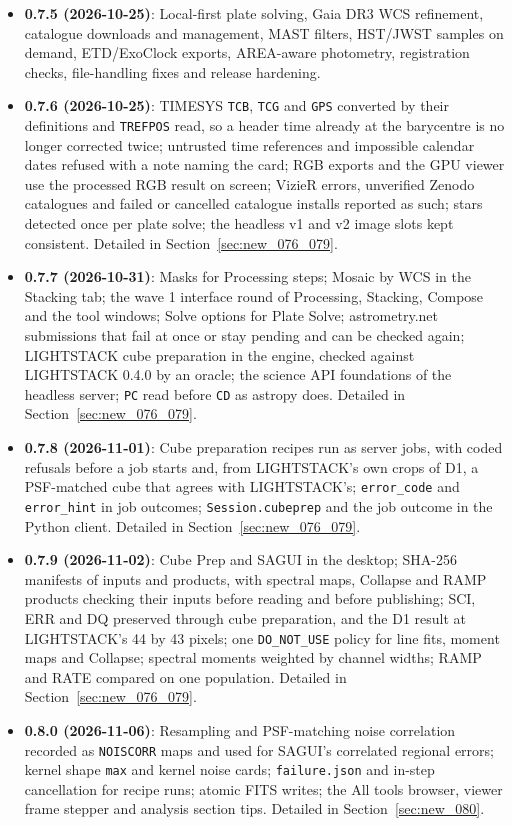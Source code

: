 \documentclass[11pt,a4paper]{article}
\newcommand{\code}[1]{\texttt{\small #1}}
\begin{document}
\begin{itemize}[nosep]
    \item \textbf{0.7.5 (2026-10-25)}: Local-first plate solving, Gaia DR3 WCS refinement, catalogue downloads and management, MAST filters, HST/JWST samples on demand, ETD/ExoClock exports, AREA-aware photometry, registration checks, file-handling fixes and release hardening.
    \item \textbf{0.7.6 (2026-10-25)}: TIMESYS \code{TCB}, \code{TCG} and \code{GPS} converted by their definitions and \code{TREFPOS} read, so a header time already at the barycentre is no longer corrected twice; untrusted time references and impossible calendar dates refused with a note naming the card; RGB exports and the GPU viewer use the processed RGB result on screen; VizieR errors, unverified Zenodo catalogues and failed or cancelled catalogue installs reported as such; stars detected once per plate solve; the headless v1 and v2 image slots kept consistent. Detailed in Section~\ref{sec:new_076_079}.
    \item \textbf{0.7.7 (2026-10-31)}: Masks for Processing steps; Mosaic by WCS in the Stacking tab; the wave 1 interface round of Processing, Stacking, Compose and the tool windows; Solve options for Plate Solve; astrometry.net submissions that fail at once or stay pending and can be checked again; LIGHTSTACK cube preparation in the engine, checked against LIGHTSTACK 0.4.0 by an oracle; the science API foundations of the headless server; \code{PC} read before \code{CD} as astropy does. Detailed in Section~\ref{sec:new_076_079}.
    \item \textbf{0.7.8 (2026-11-01)}: Cube preparation recipes run as server jobs, with coded refusals before a job starts and, from LIGHTSTACK's own crops of D1, a PSF-matched cube that agrees with LIGHTSTACK's; \code{error\_code} and \code{error\_hint} in job outcomes; \code{Session.cubeprep} and the job outcome in the Python client. Detailed in Section~\ref{sec:new_076_079}.
    \item \textbf{0.7.9 (2026-11-02)}: Cube Prep and SAGUI in the desktop; SHA-256 manifests of inputs and products, with spectral maps, Collapse and RAMP products checking their inputs before reading and before publishing; SCI, ERR and DQ preserved through cube preparation, and the D1 result at LIGHTSTACK's 44 by 43 pixels; one \code{DO\_NOT\_USE} policy for line fits, moment maps and Collapse; spectral moments weighted by channel widths; RAMP and RATE compared on one population. Detailed in Section~\ref{sec:new_076_079}.
    \item \textbf{0.8.0 (2026-11-06)}: Resampling and PSF-matching noise correlation recorded as \code{NOISCORR} maps and used for SAGUI's correlated regional errors; kernel shape \code{max} and kernel noise cards; \code{failure.json} and in-step cancellation for recipe runs; atomic FITS writes; the All tools browser, viewer frame stepper and analysis section tips. Detailed in Section~\ref{sec:new_080}.

\end{itemize}
\end{document}

